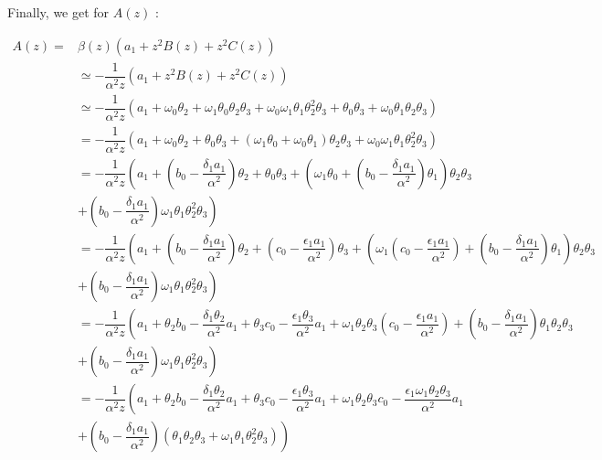 \documentclass[11pt,a4paper]{article}
\begin{document}
Finally, we get for $A(z)$ :


\begin{align*}
A(z) =  &\beta(z) (a_1  +  z^2 B(z) + z^2 C(z)) \\
& \simeq -\dfrac{1}{\alpha^2 z} (a_1  +  z^2 B(z) + z^2 C(z)) \\
& \simeq -\dfrac{1}{\alpha^2 z} (a_1  +  \omega_0 \theta_2 +  \omega_1 \theta_0  \theta_2   \theta_3  + \omega_0 \omega_1  \theta_1  \theta_2^2  \theta_3 +\theta_0 \theta_3  +    \omega_0 \theta_1 \theta_2 \theta_3) \\
&= -\dfrac{1}{\alpha^2 z} (a_1  +  \omega_0 \theta_2 + \theta_0 \theta_3+ (\omega_1 \theta_0   +  \omega_0 \theta_1) \theta_2 \theta_3 + \omega_0 \omega_1  \theta_1  \theta_2^2  \theta_3  )\\
&=-\dfrac{1}{\alpha^2 z} \left(a_1  + \left( b_0 - \dfrac{ \delta_1  a_1}{\alpha^2}\right) \theta_2 + \theta_0 \theta_3+ (\omega_1 \theta_0   +  \left( b_0 - \dfrac{ \delta_1  a_1}{\alpha^2}\right)\theta_1) \theta_2 \theta_3 \right. \\
& \left.  + \left( b_0 - \dfrac{ \delta_1  a_1}{\alpha^2}\right)\omega_1  \theta_1  \theta_2^2  \theta_3  \right)\\
&=-\dfrac{1}{\alpha^2 z} \left(a_1  + \left( b_0 - \dfrac{ \delta_1  a_1}{\alpha^2}\right) \theta_2 +\left(c_0 -\dfrac{\epsilon_1   a_1}{\alpha^2}  \right)  \theta_3+ (\omega_1 \left(c_0 -\dfrac{\epsilon_1   a_1}{\alpha^2}  \right)    +  \left( b_0 - \dfrac{ \delta_1  a_1}{\alpha^2}\right)\theta_1) \theta_2 \theta_3 \right. \\
& \left.  + \left( b_0 - \dfrac{ \delta_1  a_1}{\alpha^2}\right)\omega_1  \theta_1  \theta_2^2  \theta_3  \right)\\
&=-\dfrac{1}{\alpha^2 z} \left(a_1  + \theta_2 b_0 - \dfrac{ \delta_1  \theta_2 }{\alpha^2} a_1 +\theta_3 c_0 -\dfrac{\epsilon_1 \theta_3  }{\alpha^2}  a_1  + \omega_1  \theta_2 \theta_3 \left(c_0 -\dfrac{\epsilon_1   a_1}{\alpha^2}  \right)    +  \left( b_0 - \dfrac{ \delta_1  a_1}{\alpha^2}\right)\theta_1 \theta_2 \theta_3  \right. \\
& \left.  + \left( b_0 - \dfrac{ \delta_1  a_1}{\alpha^2}\right)\omega_1  \theta_1  \theta_2^2  \theta_3  \right)\\
&=-\dfrac{1}{\alpha^2 z} \left(a_1  + \theta_2 b_0 - \dfrac{ \delta_1  \theta_2 }{\alpha^2} a_1 +\theta_3 c_0 -\dfrac{\epsilon_1 \theta_3  }{\alpha^2}  a_1   +   \omega_1  \theta_2 \theta_3 c_0 -\dfrac{\epsilon_1   \omega_1  \theta_2 \theta_3 }{\alpha^2} a_1     \right. \\
& \left. +  \left( b_0 - \dfrac{ \delta_1  a_1}{\alpha^2}\right)(\theta_1 \theta_2 \theta_3   + \omega_1  \theta_1  \theta_2^2  \theta_3 ) \right)\\
\end{align*}
\end{document}
